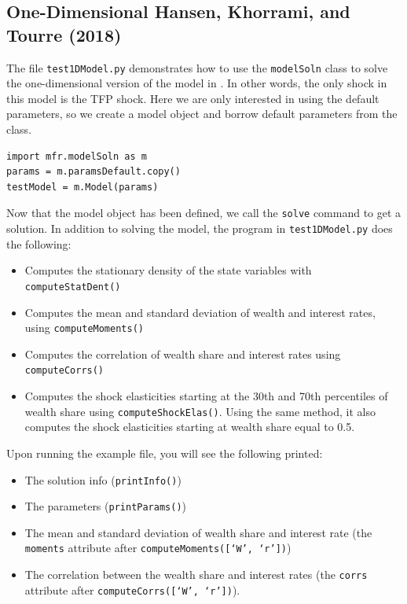\documentclass[12pt]{article}
\newcommand{\wealthProg}{W}
\begin{document}
\subsection{One-Dimensional Hansen, Khorrami, and Tourre (2018)}

The file \texttt{test1DModel.py} demonstrates how to use the \texttt{modelSoln} class to solve the
one-dimensional version of the model in \citet{HKT}. In other words, the only
shock in this model is the TFP shock. Here we are only interested in using the
default parameters, so we create a model object and borrow default parameters from
the class.

\begin{verbatim}
import mfr.modelSoln as m
params = m.paramsDefault.copy()
testModel = m.Model(params)
\end{verbatim}

Now that the model object has been defined, we call the \texttt{solve} command
to get a solution. In addition to solving the model, the program in
\texttt{test1DModel.py} does the following:

\begin{itemize}
    \item Computes the stationary density of the state variables with
    \texttt{computeStatDent()}
    \item Computes the mean and standard deviation of wealth and interest rates,
    using \texttt{computeMoments()}
    \item Computes the correlation of wealth share and interest rates using
    \texttt{computeCorrs()}
    \item Computes the shock elasticities starting at the 30th and 70th percentiles
    of wealth share using \texttt{computeShockElas()}. Using the same method, it
    also computes the shock elasticities starting at wealth share equal to 0.5.
\end{itemize}

Upon running the example file, you will see the following printed:
\begin{itemize}
    \item The solution info (\texttt{printInfo()})
    \item The parameters (\texttt{printParams()})
    \item The mean and standard deviation of wealth share and interest rate (the
    \texttt{moments} attribute after \texttt{computeMoments([`\wealthProg', `r'])})
    \item The correlation between the wealth share and interest rates (the
    \texttt{corrs} attribute after \texttt{computeCorrs([`\wealthProg', `r'])}).
\end{itemize}
\end{document}
